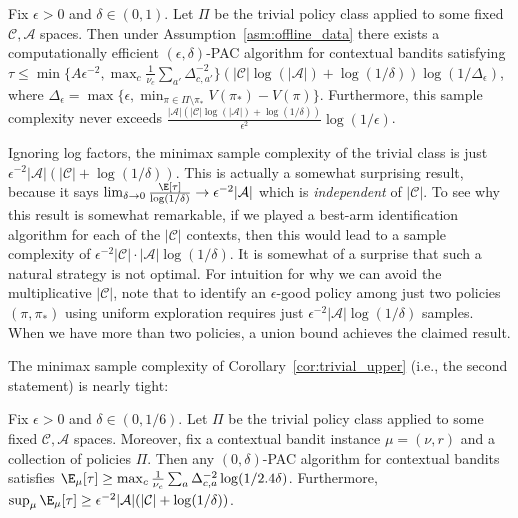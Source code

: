 \documentclass{article}
\newcommand{\mc}[1]{\mathcal{#1}}
\newcommand{\1}{\mathbf{1}}
\begin{document}
\begin{corollary}\label{cor:trivial_upper}
Fix $\epsilon >0$ and $\delta \in (0,1)$. Let $\Pi$ be the trivial policy class applied to some fixed $\mc{C},\mc{A}$ spaces. Then under Assumption~\ref{asm:offline_data} there exists a  computationally efficient $(\epsilon,\delta)$-PAC algorithm for contextual bandits satisfying $\tau \leq \min\{ A \epsilon^{-2}, \max_{c} \frac{1}{\nu_c} \sum_{a'} \Delta_{c,a'}^{-2} \} ( |\mc{C}| \log(|\mc{A}|) + \log( 1 /\delta )) \log(1/\Delta_\epsilon)$, where $\Delta_\epsilon = \max\{ \epsilon, \min_{\pi \in \Pi \setminus \pi_*}V(\pi_*)-V(\pi) \}$. 
Furthermore, this sample complexity never exceeds $\frac{|\mc{A}| (|\mc{C}|\log(|\mc{A}|) + \log(1/\delta))}{\epsilon^2} \log(1/\epsilon)$.
\end{corollary}
\noindent 
Ignoring log factors, the minimax sample complexity of the trivial class is just $\epsilon^{-2} |\mc{A}| ( |\mc{C}| + \log(1/\delta))$.
This is actually a somewhat surprising result, because it says $\lim_{\delta \rightarrow 0} \frac{\E[\tau]}{\log(1/\delta)} \rightarrow \epsilon^{-2} |\mc{A}|$ which is \emph{independent} of $|\mc{C}|$.
To see why this result is somewhat remarkable, if we played a best-arm identification algorithm for each of the $|\mc{C}|$ contexts, then this would lead to a sample complexity of $\epsilon^{-2} |\mc{C}| \cdot |\mc{A}| \log(1/\delta)$. 
It is somewhat of a surprise that such a natural strategy is not optimal. 
For intuition for why we can avoid the multiplicative $|\mc{C}|$, note that to identify an $\epsilon$-good policy among just two policies $(\pi,\pi_*)$ using uniform exploration requires just $\epsilon^{-2}|\mc{A}|\log(1/\delta)$ samples. When we have more than two policies, a union bound achieves the claimed result.  

The minimax sample complexity of Corollary~\ref{cor:trivial_upper} (i.e., the second statement) is nearly tight:
\begin{theorem}\label{thm:trivial-class-lower}
Fix $\epsilon > 0$ and $\delta \in (0,1/6)$.
Let $\Pi$ be the trivial policy class applied to some fixed $\mc{C},\mc{A}$ spaces.
Moreover, fix a contextual bandit instance $\mu = (\nu,r)$ and a collection of policies $\Pi$.
Then any $(0,\delta)$-PAC algorithm for contextual bandits satisfies $\E_\mu[\tau] \geq \max_{c} \frac{1}{\nu_c} \sum_{a} \Delta_{c,a}^{-2} \log(1/2.4 \delta)$.
Furthermore, $\sup_\mu \E_\mu[\tau] \geq \epsilon^{-2}|\mc{A}|( |\mc{C}| +   \log(1/ \delta))$.
\end{theorem}
\end{document}
